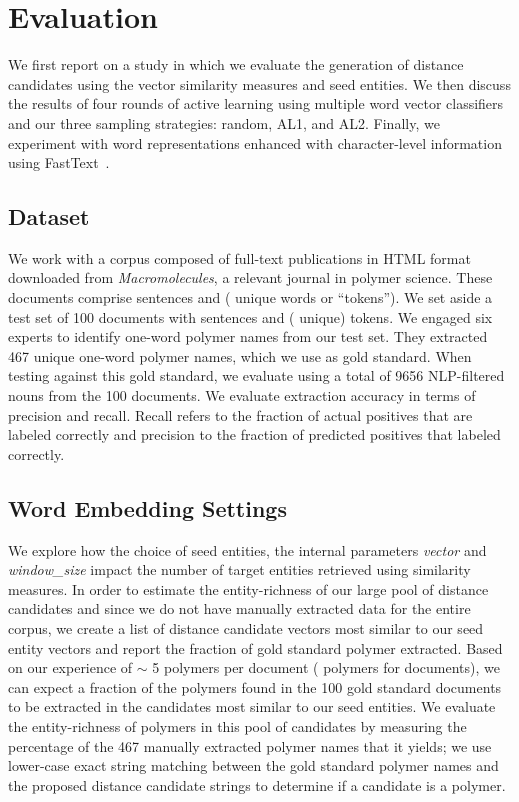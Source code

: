 \section{Evaluation}
\label{sect:apner_results}
We first report on a study in which we evaluate the generation of distance candidates using the vector similarity measures and seed entities. 
We then discuss the results of four rounds of active learning using multiple word vector classifiers and our three sampling strategies: random, AL1, and AL2.
Finally, we experiment with word representations enhanced with character-level information using FastText~\cite{bojanowski2016enriching,joulin2016bag}.

\subsection{Dataset}
We work with a corpus composed of  full-text publications in HTML format downloaded from \textit{Macromolecules}, a relevant journal in polymer science.
These documents comprise  sentences and  ( unique words or ``tokens'').
We set aside a test set of  100 documents with   sentences and  ( unique) tokens. 
We engaged six experts to identify one-word polymer names from our test set.
They extracted 467 unique one-word polymer names, which we use as gold standard.
When testing against this gold standard, we evaluate using a total of 9656 NLP-filtered nouns from the 100 documents.
We evaluate extraction accuracy in terms of precision and recall.
Recall refers to the fraction of actual positives that
are labeled correctly and precision to the fraction of predicted
positives that labeled correctly.

\subsection{Word Embedding Settings}
We explore how the choice of seed entities, the internal parameters \textit{vector} and \textit{window_size}  impact the number of target entities retrieved using similarity measures.
In order to estimate the entity-richness of our large pool of distance candidates and since we do not have manually extracted data for the entire corpus, we create a list of  distance candidate vectors most similar to our seed entity vectors and report the fraction of gold standard polymer extracted. 
Based on our experience of $\sim$ 5 polymers per document ( polymers for  documents), we can expect a fraction of the polymers found in the 100 gold standard documents to be extracted in the  candidates most similar to our seed entities.
We evaluate the entity-richness of polymers in this pool of candidates by measuring the percentage of the 467 manually extracted polymer names that it yields;
we use lower-case exact string matching between the gold standard polymer names and the proposed distance candidate strings to determine if a candidate is a polymer.

